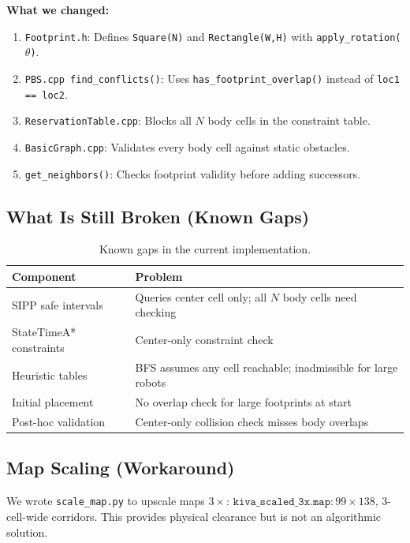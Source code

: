 \documentclass[12pt, a4paper]{article}
\begin{document}
\textbf{What we changed:}
\begin{enumerate}
    \item \texttt{Footprint.h}: Defines \texttt{Square(N)} and \texttt{Rectangle(W,H)} with \texttt{apply\_rotation($\theta$)}.
    \item \texttt{PBS.cpp find\_conflicts()}: Uses \texttt{has\_footprint\_overlap()} instead of \texttt{loc1 == loc2}.
    \item \texttt{ReservationTable.cpp}: Blocks all $N$ body cells in the constraint table.
    \item \texttt{BasicGraph.cpp}: Validates every body cell against static obstacles.
    \item \texttt{get\_neighbors()}: Checks footprint validity before adding successors.
\end{enumerate}

\subsection{What Is Still Broken (Known Gaps)}

\begin{table}[H]
\centering
\small
\begin{tabular}{@{}lp{8cm}@{}}
\toprule
\textbf{Component} & \textbf{Problem} \\
\midrule
SIPP safe intervals & Queries center cell only; all $N$ body cells need checking \\
StateTimeA* constraints & Center-only constraint check \\
Heuristic tables & BFS assumes any cell reachable; inadmissible for large robots \\
Initial placement & No overlap check for large footprints at start \\
Post-hoc validation & Center-only collision check misses body overlaps \\
\bottomrule
\end{tabular}
\caption{Known gaps in the current implementation.}
\end{table}

\subsection{Map Scaling (Workaround)}
We wrote \texttt{scale\_map.py} to upscale maps $3\times$:
$\texttt{kiva\_scaled\_3x.map}: 99 \times 138$, 3-cell-wide corridors.
This provides physical clearance but is not an algorithmic solution.
\end{document}
